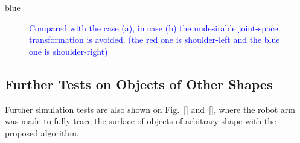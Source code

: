 \documentclass[journal]{IEEEtran}
\begin{document}
\begin{color}{blue}
\begin{figure}[t]
\label{figtaskb}
\caption{\textcolor{blue}{Compared with the case (a), in case (b) the undesirable joint-space transformation is avoided. (the red one is shoulder-left and the blue one is shoulder-right) } }
\end{figure}

\subsection{Further Tests on Objects of Other Shapes}
\label{sec:other_sim_examples}
\end{color}
Further simulation tests are also shown on Fig.~\ref{} and~\ref{}, where the robot arm was made to fully trace the surface of objects of arbitrary shape with the proposed algorithm. 
\end{document}

